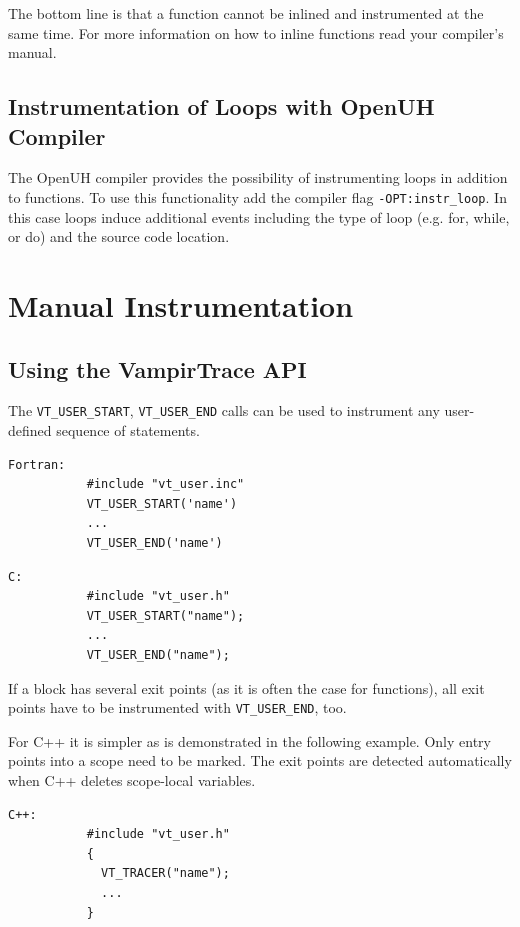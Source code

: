 \documentclass[a4paper,twoside,12pt,BCOR12mm]{scrbook}
\begin{document}
The bottom line is that a function cannot be inlined and instrumented at the same time.
For more information on how to inline functions read your compiler's manual.

\subsection{Instrumentation of Loops with OpenUH Compiler}
\label{subsec:openuh_loop}
The OpenUH compiler provides the possibility of instrumenting loops in addition to functions.
To use this functionality add the compiler flag \texttt{-OPT:instr\_loop}. In this
case loops induce additional events including the type of loop (e.g. for, while, or do)
and the source code location.


\section{Manual Instrumentation}
\label{sec:maninst}
\subsection{Using the VampirTrace API}

The \texttt{VT\_USER\_START}, \texttt{VT\_USER\_END} calls 
can be used to instrument any user-defined sequence of statements. 

\begin{verbatim}
Fortran: 
           #include "vt_user.inc"
           VT_USER_START('name')
           ...
           VT_USER_END('name')
\end{verbatim} 

\begin{verbatim}
C:
           #include "vt_user.h"
           VT_USER_START("name");
           ...
           VT_USER_END("name");
\end{verbatim}
If a block has several exit points (as it is often the case for
functions), all exit points have to be instrumented with 
\texttt{VT\_USER\_END}, too.

For C++ it is simpler as is demonstrated in the following example. Only entry points into a 
scope need to be marked. The exit points are detected automatically when C++ 
deletes scope-local variables.

\begin{verbatim}
C++:
           #include "vt_user.h"
           {
             VT_TRACER("name");
             ...
           }
\end{verbatim} 
  
\end{document}
